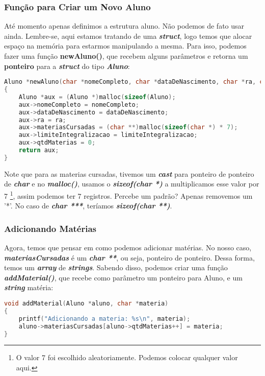 \subsubsection{Função para Criar um Novo Aluno}
Até momento apenas definimos a estrutura aluno. Não podemos de fato usar ainda. Lembre-se, aqui estamos tratando de uma \textbf{\textit{struct}}, logo temos que alocar espaço na memória para estarmos manipulando a mesma. Para isso, podemos fazer uma função \textbf{newAluno()}, que recebem alguns parâmetros e retorna um \textbf{ponteiro} para a \textbf{\textit{struct}} do tipo \textbf{\textit{Aluno}}:
\begin{lstlisting}[language=C]
Aluno *newAluno(char *nomeCompleto, char *dataDeNascimento, char *ra, char *limiteIntegralizacao)
{
    Aluno *aux = (Aluno *)malloc(sizeof(Aluno);
    aux->nomeCompleto = nomeCompleto;
    aux->dataDeNascimento = dataDeNascimento;
    aux->ra = ra;
    aux->materiasCursadas = (char **)malloc(sizeof(char *) * 7);
    aux->limiteIntegralizacao = limiteIntegralizacao;
    aux->qtdMaterias = 0;
    return aux;
}
\end{lstlisting}

Note que para as materias cursadas, tivemos um \textbf{\textit{cast}} para ponteiro de ponteiro de \textbf{\textit{char}} e no \textbf{\textit{malloc()}}, usamos o \textbf{\textit{sizeof(char *)}} a multiplicamos esse valor por 7 \footnote{O valor 7 foi escolhido aleatoriamente. Podemos colocar qualquer valor aqui.}, assim podemos ter 7 registros. Percebe um padrão? Apenas removemos um '*'. No caso de \textbf{\textit{char ***}}, teríamos \textbf{\textit{sizeof(char **)}}.

\subsubsection{Adicionando Matérias}
Agora, temos que pensar em como podemos adicionar matérias. No nosso caso, \textbf{\textit{materiasCursadas}} é um \textbf{\textit{char **}}, ou seja, ponteiro de ponteiro. Dessa forma, temos um \textbf{\textit{array}} de \textbf{\textit{strings}}. Sabendo disso, podemos criar uma função \textbf{\textit{addMaterial()}}, que recebe como parâmetro um ponteiro para Aluno, e um \textbf{\textit{string}} matéria:
\begin{lstlisting}[language=C]
void addMaterial(Aluno *aluno, char *materia)
{
    printf("Adicionando a materia: %s\n", materia);
    aluno->materiasCursadas[aluno->qtdMaterias++] = materia;
}
\end{lstlisting}

